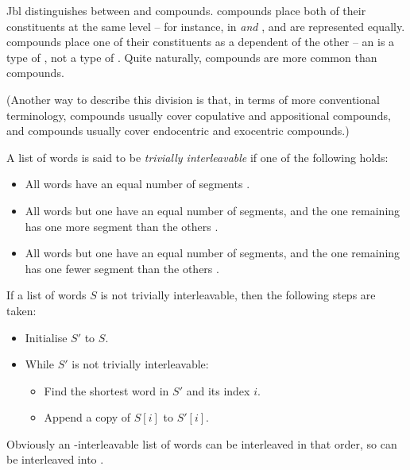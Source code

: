 \documentclass{book}
\newcommand{\lname}{Jbl}
\begin{document}
\lname{} distinguishes between  and  compounds.  compounds place both of their constituents at the same level -- for instance, in \emph{ and },  and  are represented equally.  compounds place one of their constituents as a dependent of the other -- an \emph{} is a type of , not a type of . Quite naturally,  compounds are more common than  compounds.

(Another way to describe this division is that, in terms of more conventional terminology,  compounds usually cover copulative and appositional compounds, and  compounds usually cover endocentric and exocentric compounds.)

A list of words is said to be \emph{trivially interleavable} if one of the following holds:

\newcommand{\tieq}{\hlvi{(eq)}}
\newcommand{\tiaug}{\hlvii{(aug)}}
\newcommand{\tidim}{\hlviii{(dim)}}

\begin{itemize}
  \item All words have an equal number of segments \tieq{}.
  \item All words but one have an equal number of segments, and the one remaining has one more segment than the others \tiaug{}.
  \item All words but one have an equal number of segments, and the one remaining has one fewer segment than the others \tidim{}.
\end{itemize}

If a list of words $S$ is not trivially interleavable, then the following steps are taken:

\begin{itemize}
  \item Initialise $S'$ to $S$.
  \item While $S'$ is not trivially interleavable:
  \begin{itemize}
    \item Find the shortest word in $S'$ and its index $i$.
    \item Append a copy of $S[i]$ to $S'[i]$.
  \end{itemize}
\end{itemize}

Obviously an \tieq-interleavable list of words can be interleaved in that order, so  can be interleaved into .
\end{document}
